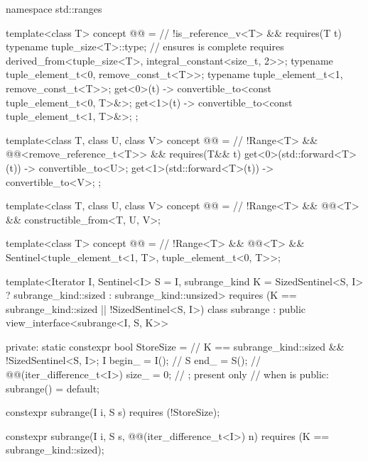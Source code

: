 %
\begin{codeblock}
namespace std::ranges {
  template<class T>
    concept @@ =                                    // \expos
      !is_reference_v<T> && requires(T t) {
        typename tuple_size<T>::type;   // ensures  is complete
        requires derived_from<tuple_size<T>, integral_constant<size_t, 2>>;
        typename tuple_element_t<0, remove_const_t<T>>;
        typename tuple_element_t<1, remove_const_t<T>>;
        { get<0>(t) } -> convertible_to<const tuple_element_t<0, T>&>;
        { get<1>(t) } -> convertible_to<const tuple_element_t<1, T>&>;
      };

  template<class T, class U, class V>
    concept @@ =                     // \expos
      !Range<T> && @@<remove_reference_t<T>> &&
      requires(T&& t) {
        { get<0>(std::forward<T>(t)) } -> convertible_to<U>;
        { get<1>(std::forward<T>(t)) } -> convertible_to<V>;
      };

  template<class T, class U, class V>
    concept @@ =                   // \expos
      !Range<T> && @@<T> && constructible_from<T, U, V>;

  template<class T>
    concept @@ =                       // \expos
      !Range<T> && @@<T> &&
      Sentinel<tuple_element_t<1, T>, tuple_element_t<0, T>>;

  template<Iterator I, Sentinel<I> S = I, subrange_kind K =
      SizedSentinel<S, I> ? subrange_kind::sized : subrange_kind::unsized>
    requires (K == subrange_kind::sized || !SizedSentinel<S, I>)
  class subrange : public view_interface<subrange<I, S, K>> {
  private:
    static constexpr bool StoreSize =                      // \expos
      K == subrange_kind::sized && !SizedSentinel<S, I>;
    I begin_ = I();                                        // \expos
    S end_ = S();                                          // \expos
    @@(iter_difference_t<I>) size_ = 0;  // \expos; present only
                                                           // when  is 
  public:
    subrange() = default;

    constexpr subrange(I i, S s) requires (!StoreSize);

    constexpr subrange(I i, S s, @@(iter_difference_t<I>) n)
      requires (K == subrange_kind::sized);

}}
\end{codeblock}
